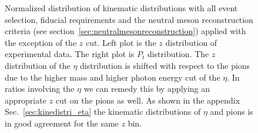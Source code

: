 \begin{figure}[H]
  \centering     
  \caption[Normalized kinematic distributions]{Normalized distribution of kinematic distributions with all event selection, fiducial requirements and the neutral meson reconstruction criteria (see section~\ref{sec:neutralmesonreconstruction}) applied with the exception of the $z$ cut. Left plot is the $z$ distribution of experimental data. The right plot is $P_t$ distribution. The $z$ distribution of the $\eta$ distribution is shifted with respect to the pions due to the higher mass and higher photon energy cut of the $\eta$. In ratios involving the $\eta$ we can remedy this by applying an appropriate $z$ cut on the pions as well. As shown in the appendix Sec.~\ref{sec:kinedistri_eta} the kinematic distributions of $\eta$ and pions is in good agreement for the same $z$ bin. }
  \label{fig:zptdistri}
\end{figure}

